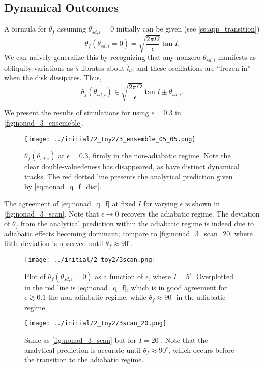 \documentclass[
        fleqn,
        usenatbib,
    ]{mnras}
\newcommand*{\p}[1]{\left(#1\right)}
\begin{document}
\subsection{Dynamical Outcomes}

A formula for $\theta_{f}$ assuming $\theta_{sd, i} = 0$ initially can be
given (see \autoref{ss:app_transition})
\begin{equation}
    \theta_{f}\p{\theta_{sd, i} = 0} = \sqrt{\frac{2\pi \Omega}{\epsilon}}
        \tan I.\label{eq:nonad_q_f}
\end{equation}
We can naively generalize this by recognizing that any nonzero $\theta_{sd, i}$
manifests as obliquity variations as $\hat{s}$ librates about $\hat{l}_d$, and
these oscillations are ``frozen in'' when the disk dissipates. Thus,
\begin{equation}
    \theta_{f}\p{\theta_{sd, i}} \in \sqrt{\frac{2\pi \Omega}{\epsilon}}
        \tan I \pm \theta_{sd, i}.\label{eq:nonad_q_f_dist}
\end{equation}

We present the results of simulations for using $\epsilon = 0.3$ in
\autoref{fig:nonad_3_ensemeble}.
\begin{figure}
    \centering
    \texttt{[image: ../initial/2\_toy2/3\_ensemble\_05\_05.png]}
    \caption{$\theta_{ f}\p{\theta_{sd, i}}$ at $\epsilon = 0.3$, firmly in
    the non-adiabatic regime. Note the clear double-valuedeness has disappeared,
    as have distinct dynamical tracks. The red dotted line presents the
    analytical prediction given by
    \autoref{eq:nonad_q_f_dist}.}\label{fig:nonad_3_ensemeble}
\end{figure}

The agreement of \autoref{eq:nonad_q_f} at fixed $I$ for varying $\epsilon$ is
shown in \autoref{fig:nonad_3_scan}. Note that $\epsilon \to 0$ recovers the
adiabatic regime. The deviation of $\theta_f$ from the analytical prediction
within the adiabatic regime is indeed due to adiabatic effects becoming
dominant; compare to \autoref{fig:nonad_3_scan_20} where little deviation is
observed until $\theta_f \approx 90^\circ$.
\begin{figure}
    \centering
    \texttt{[image: ../initial/2\_toy2/3scan.png]}
    \caption{Plot of $\theta_{ f}\p{\theta_{sd, i} = 0}$ as a function of
    $\epsilon$, where $I = 5^\circ$. Overplotted in the red line is
    \autoref{eq:nonad_q_f}, which is in good agreement for $\epsilon \gtrsim
    0.1$ the non-adiabatic regime, while $\theta_{ f} \approx 90^\circ$ in
    the adiabatic regime.}\label{fig:nonad_3_scan}
\end{figure}
\begin{figure}
    \centering
    \texttt{[image: ../initial/2\_toy2/3scan\_20.png]}
    \caption{Same as \autoref{fig:nonad_3_scan} but for $I=20^\circ$. Note that
    the analytical prediction is accurate until $\theta_f \approx 90^\circ$,
    which occurs before the transition to the adiabatic
    regime.}\label{fig:nonad_3_scan_20}
\end{figure}
\end{document}
